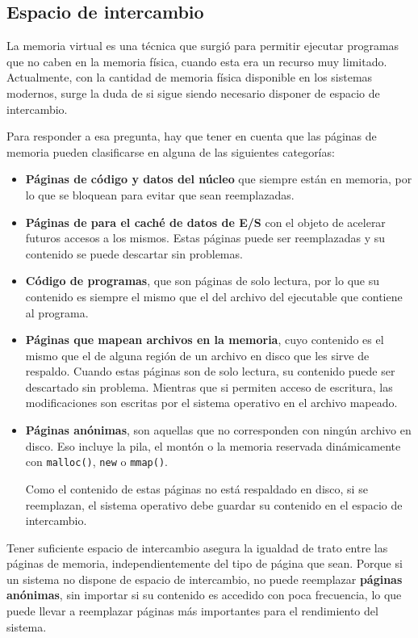 \subsection{Espacio de intercambio}\label{_espacio_de_intercambio}

La memoria virtual es una técnica que surgió para permitir ejecutar
programas que no caben en la memoria física, cuando esta era un recurso
muy limitado. Actualmente, con la cantidad de memoria física disponible
en los sistemas modernos, surge la duda de si sigue siendo necesario
disponer de espacio de intercambio.

Para responder a esa pregunta, hay que tener en cuenta que las páginas
de memoria pueden clasificarse en alguna de las siguientes categorías:

\begin{itemize}
\item
  \textbf{Páginas de código y datos del núcleo} que siempre están en
  memoria, por lo que se bloquean para evitar que sean reemplazadas.
\item
  \textbf{Páginas de para el caché de datos de E/S} con el objeto de
  acelerar futuros accesos a los mismos. Estas páginas puede ser
  reemplazadas y su contenido se puede descartar sin problemas.
\item
  \textbf{Código de programas}, que son páginas de solo lectura, por lo
  que su contenido es siempre el mismo que el del archivo del ejecutable
  que contiene al programa.
\item
  \textbf{Páginas que mapean archivos en la memoria}, cuyo contenido es
  el mismo que el de alguna región de un archivo en disco que les sirve
  de respaldo. Cuando estas páginas son de solo lectura, su contenido
  puede ser descartado sin problema. Mientras que si permiten acceso de
  escritura, las modificaciones son escritas por el sistema operativo en
  el archivo mapeado.
\item
  \textbf{Páginas anónimas}, son aquellas que no corresponden con ningún
  archivo en disco. Eso incluye la pila, el montón o la memoria
  reservada dinámicamente con \texttt{malloc()}, \texttt{new} o
  \texttt{mmap()}.

  Como el contenido de estas páginas no está respaldado en disco, si se
  reemplazan, el sistema operativo debe guardar su contenido en el
  espacio de intercambio.
\end{itemize}

Tener suficiente espacio de intercambio asegura la igualdad de trato
entre las páginas de memoria, independientemente del tipo de página que
sean. Porque si un sistema no dispone de espacio de intercambio, no
puede reemplazar \textbf{páginas anónimas}, sin importar si su contenido
es accedido con poca frecuencia, lo que puede llevar a reemplazar
páginas más importantes para el rendimiento del sistema.

